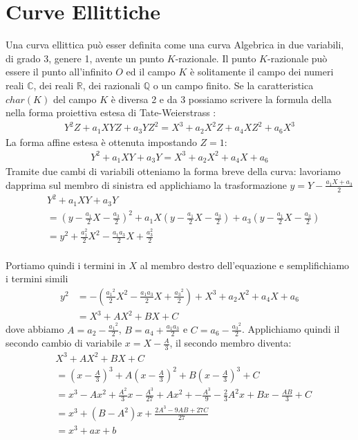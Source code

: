 \documentclass[a4paper,12pt]{tesiinfo}
\begin{document}
\chapter{Curve Ellittiche}
Una curva ellittica pu\`o esser definita come una curva Algebrica in due variabili, di grado 3, genere 1, avente un punto $K$-razionale. Il punto $K$-razionale pu\`o essere il punto all'infinito $O$ ed il campo $K$ \`e solitamente il campo dei numeri reali $\mathbb{C}$, dei reali $\mathbb{R}$, dei razionali $\mathbb{Q}$ o un campo finito. Se la caratteristica $char(K)$ del campo $K$ \`e diversa 2 e da 3 possiamo scrivere la formula della nella forma proiettiva estesa di Tate-Weierstrass :
\begin{gather}
Y^{2}Z + a_1XYZ + a_3YZ^2 =X^3 + a_2X^2Z + a_4XZ^2 + a_6X^3
\end{gather}
La forma affine estesa \`e ottenuta impostando $Z=1$: 
\begin{gather}
Y^{2} + a_1XY + a_3Y =X^3 + a_2X^2 + a_4X + a_6
\end{gather}
Tramite due cambi di variabili otteniamo la forma breve della curva: lavoriamo dapprima sul membro di sinistra ed applichiamo la trasformazione $y = Y - \frac{a_1X + a_3}{2}$
\begin{align*}
&Y^{2} + a_1XY + a_3Y  
\\ 
&= \left ( y - \frac{a_1}{2}X - \frac{a_3}{2} \right )^2 + a_1X \left ( y - \frac{a_1}{2}X - \frac{a_3}{2} \right ) + a_3 \left ( y - \frac{a_1}{2}X - \frac{a_3}{2} \right ) 
\\
&= y^2 + \frac{a_1^2}{2}X^2 - \frac{a_1a_3}{2}X +\frac{a_3^2}{2} 
\end{align*}
\\
Portiamo quindi i termini in $X$ al membro destro dell'equazione e semplifichiamo i termini simili
\begin{align*}
y^2 &= - \left ( \frac{{a_1}^2}{2}X^2 - \frac{a_1a_3}{2}X +\frac{{a_3}^2}{2} \right ) + X^3 + a_2X^2 + a_4X + a_6
\\
&= X^3 + AX^2 + BX + C 
\end{align*}
dove abbiamo $A = a_2 - \frac{{a_1}^2}{2}$, $B = a_4 + \frac{a_1a_3}{2}$ e $C = a_6 - \frac{{a_3}^2}{2}$.
Applichiamo quindi il secondo cambio di variabile $x = X - \frac{A}{3}$, il secondo membro diventa:
\begin{align*}
&X^3 + AX^2 + BX + C 
\\
&=\left(x- \frac{A}{3} \right )^3 +A\left ( x - \frac{A}{3} \right )^2 + B\left (x - \frac{A}{3} \right )^3 +C
\\
&= x^3-Ax^2 + \frac{A^2}{3}x - \frac{A^3}{27} + Ax^2 + - \frac{A^3}{9} -\frac{2}{3}A^2x + Bx - \frac{AB}{3} +C
\\
&= x^3 + (B-A^2)x + \frac{2A^3-9AB+27C}{27}
\\
&= x^3 + ax+b
\end{align*}
\end{document}
